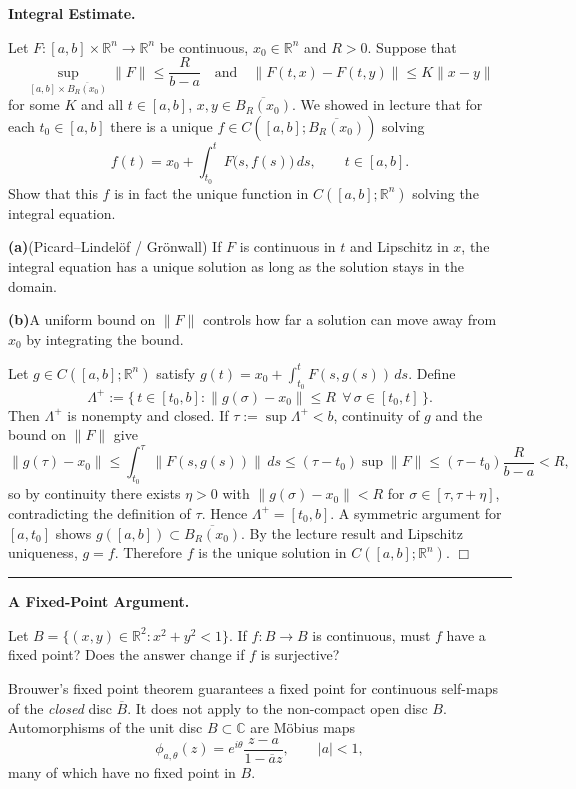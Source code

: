 \begin{problem}[CP-II-0023]
\label{prob:cp-ii-0023}
\textbf{Integral Estimate.}

\hspace*{1.5em}Let $F:[a,b]\times\mathbb{R}^n\to\mathbb{R}^n$ be continuous, $x_0\in\mathbb{R}^n$ and $R>0$.
Suppose that
\[
\sup_{[a,b]\times \overline{B_R(x_0)}}\|F\|\le \frac{R}{b-a}
\quad\text{and}\quad
\|F(t,x)-F(t,y)\|\le K\|x-y\|
\]
for some $K$ and all $t\in[a,b]$, $x,y\in\overline{B_R(x_0)}$.
We showed in lecture that for each $t_0\in[a,b]$ there is a unique
$f\in C([a,b];\overline{B_R(x_0)})$ solving
\[
f(t)=x_0+\int_{t_0}^{t}F\big(s,f(s)\big)\,ds,\qquad t\in[a,b].
\]
Show that this $f$ is in fact the unique function in $C([a,b];\mathbb{R}^n)$ solving the integral equation.

 \setlength{\itemsep}{6pt}
	\par\smallskip\noindent\textbf{(a)}\quad (Picard--Lindel\"of / Gr\"onwall) If $F$ is continuous in $t$ and Lipschitz in $x$, the integral equation has a unique solution as long as the solution stays in the domain.
	\par\smallskip\noindent\textbf{(b)}\quad A uniform bound on $\|F\|$ controls how far a solution can move away from $x_0$ by integrating the bound.
\end{problem}

\begin{solution}
Let $g\in C([a,b];\mathbb{R}^n)$ satisfy $g(t)=x_0+\int_{t_0}^{t}F(s,g(s))\,ds$.
Define
\[
\Lambda^+ := \{\,t\in[t_0,b] : \|g(\sigma)-x_0\|\le R\ \ \forall\,\sigma\in[t_0,t]\,\}.
\]
Then $\Lambda^+$ is nonempty and closed. If $\tau:=\sup\Lambda^+<b$, continuity of $g$ and the bound on
$\|F\|$ give
\[
\|g(\tau)-x_0\|
\le \int_{t_0}^{\tau}\|F(s,g(s))\|\,ds
\le (\tau-t_0)\sup\|F\|
\le (\tau-t_0)\frac{R}{b-a}<R,
\]
so by continuity there exists $\eta>0$ with $\|g(\sigma)-x_0\|<R$ for $\sigma\in[\tau,\tau+\eta]$,
contradicting the definition of $\tau$. Hence $\Lambda^+=[t_0,b]$.
A symmetric argument for $[a,t_0]$ shows $g([a,b])\subset\overline{B_R(x_0)}$.
By the lecture result and Lipschitz uniqueness, $g=f$.
Therefore $f$ is the unique solution in $C([a,b];\mathbb{R}^n)$.
\hfill$\Box$

\bigskip\hrule\bigskip
\end{solution}

\begin{problem}[CP-II-0047]
\label{prob:cp-ii-0047}
\textbf{A Fixed-Point Argument.}

\hspace*{1.5em}Let \(B=\{(x,y)\in\mathbb{R}^2: x^2+y^2<1\}\).
If \(f:B\to B\) is continuous, must \(f\) have a fixed point?
Does the answer change if \(f\) is surjective?

\smallskip

Brouwer's fixed point theorem guarantees a fixed point for continuous self-maps
of the \emph{closed} disc \(\overline{B}\).
It does not apply to the non-compact open disc \(B\).
Automorphisms of the unit disc \(B\subset\mathbb{C}\) are Möbius maps
\[
\phi_{a,\theta}(z)=e^{i\theta}\frac{z-a}{1-\overline{a}z},\qquad |a|<1,
\]
many of which have no fixed point in \(B\).

\smallskip
\end{problem}

